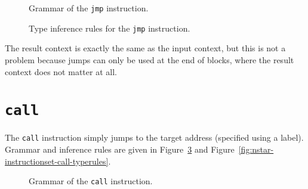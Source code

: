 \begin{figure}[H]
  \centering


  \caption{Grammar of the \texttt{jmp} instruction.}
  \label{fig:nstar-instructionset-jmp-grammar}
\end{figure}

\begin{figure}[H]
  \centering


  \caption{Type inference rules for the \texttt{jmp} instruction.}
  \label{fig:nstar-instructionset-jmp-typerules}
\end{figure}

The result context is exactly the same as the input context, but this is not a problem because jumps can only be used at the end of blocks, where the result context does not matter at all.

\section{\texttt{call}}\label{sec:nstar-instructionset-call}

The \texttt{call} instruction simply jumps to the target address (specified using a label).
Grammar and inference rules are given in Figure~\ref{fig:nstar-instructionset-call-grammar} and Figure~\ref{fig:nstar-instructionset-call-typerules}.

\begin{figure}[H]
  \centering


  \caption{Grammar of the \texttt{call} instruction.}
  \label{fig:nstar-instructionset-call-grammar}
\end{figure}

